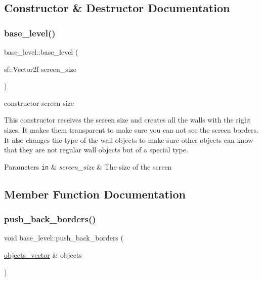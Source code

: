 \subsection{Constructor \& Destructor Documentation}
\mbox{\label{classbase__level_addf165fdc5f4e953be3b6a2dcd00459b}} 
\subsubsection{\texorpdfstring{base\+\_\+level()}{base\_level()}}
{\footnotesize\ttfamily base\+\_\+level\+::base\+\_\+level (\begin{DoxyParamCaption}\item[{sf\+::\+Vector2f}]{screen\+\_\+size }\end{DoxyParamCaption})}



constructor screen size 

This constructor receives the screen size and creates all the walls with the right sizes. It makes them transparent to make sure you can not see the screen borders. It also changes the type of the wall objects to make sure other objects can know that they are not regular wall objects but of a special type. 
\begin{DoxyParams}[1]{Parameters}
\mbox{\tt in}  & {\em screen\+\_\+size} & The size of the screen \\
\hline
\end{DoxyParams}


\subsection{Member Function Documentation}
\mbox{\label{classbase__level_a3b2da28cf45cad434103e81ee6c4538d}} 
\subsubsection{\texorpdfstring{push\+\_\+back\+\_\+borders()}{push\_back\_borders()}}
{\footnotesize\ttfamily void base\+\_\+level\+::push\+\_\+back\+\_\+borders (\begin{DoxyParamCaption}\item[{\hyperlink{drawable_8hpp_a6c0fdb1dfd0c34dbbdbb5dcd3c608b07}{objects\+\_\+vector} \&}]{objects }\end{DoxyParamCaption})}



